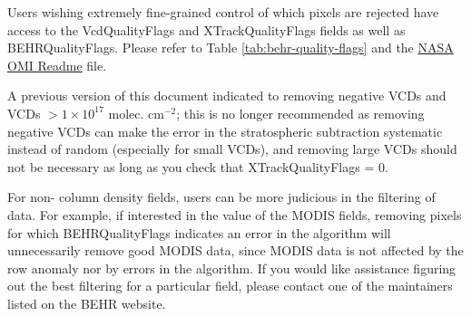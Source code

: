 \documentclass[12pt]{article}
\begin{document}
	Users wishing extremely fine-grained control of which pixels are rejected have access to the VcdQualityFlags and XTrackQualityFlags fields as well as BEHRQualityFlags. Please refer to Table \ref{tab:behr-quality-flags} and the \href{https://acdisc.gesdisc.eosdis.nasa.gov/data//Aura_OMI_Level3/OMNO2d.003/doc/README.OMNO2.pdf}{NASA OMI  Readme} file.
	
	A previous version of this document indicated to removing negative VCDs and VCDs $> 1 \times 10^{17}$ molec. cm$^{-2}$; this is no longer recommended as removing negative VCDs can make the error in the stratospheric subtraction systematic instead of random (especially for small VCDs), and removing large VCDs should not be necessary as long as you check that XTrackQualityFlags = 0.
	
	For non- column density fields, users can be more judicious in the filtering of data. For example, if interested in the value of the MODIS fields, removing pixels for which BEHRQualityFlags indicates an error in the  algorithm will unnecessarily remove good MODIS data, since MODIS data is not affected by the row anomaly nor by errors in the  algorithm. If you would like assistance figuring out the best filtering for a particular field, please contact one of the maintainers listed on the BEHR website.

	
	
	
	
\end{document}
